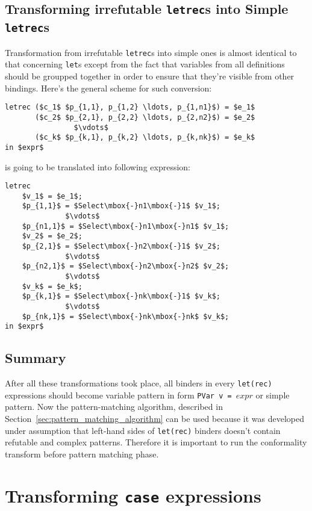\documentclass[a4paper]{report}
\begin{document}
\subsection{Transforming irrefutable \texttt{letrec}s into Simple \texttt{letrec}s}
Transformation from irrefutable \texttt{letrec}s into simple ones is almost
identical to that concerning \texttt{let}s except from the fact that variables
from all definitions should be groupped together in order to ensure that
they're visible from other bindings. Here's the general scheme for such
conversion:
\begin{lstlisting}[mathescape=true]
letrec ($c_1$ $p_{1,1}, p_{1,2} \ldots, p_{1,n1}$) = $e_1$
       ($c_2$ $p_{2,1}, p_{2,2} \ldots, p_{2,n2}$) = $e_2$
                $\vdots$
       ($c_k$ $p_{k,1}, p_{k,2} \ldots, p_{k,nk}$) = $e_k$
in $expr$
\end{lstlisting}
is going to be translated into following expression:
\begin{lstlisting}[mathescape=true]
letrec
    $v_1$ = $e_1$;
    $p_{1,1}$ = $Select\mbox{-}n1\mbox{-}1$ $v_1$;
              $\vdots$
    $p_{n1,1}$ = $Select\mbox{-}n1\mbox{-}n1$ $v_1$;
    $v_2$ = $e_2$;
    $p_{2,1}$ = $Select\mbox{-}n2\mbox{-}1$ $v_2$;
              $\vdots$
    $p_{n2,1}$ = $Select\mbox{-}n2\mbox{-}n2$ $v_2$;
              $\vdots$
    $v_k$ = $e_k$;
    $p_{k,1}$ = $Select\mbox{-}nk\mbox{-}1$ $v_k$;
              $\vdots$
    $p_{nk,1}$ = $Select\mbox{-}nk\mbox{-}nk$ $v_k$;
in $expr$
\end{lstlisting}

\subsection{Summary}
After all these transformations took place, all binders in every
\texttt{let(rec)} expressions should become variable pattern in form
\texttt{PVar v = $expr$} or simple pattern. Now the pattern-matching algorithm,
described in Section~\ref{sec:pattern_matching_algorithm} can be used because
it was developed under assumption that left-hand sides of \texttt{let(rec)}
binders doesn't contain refutable and complex patterns. Therefore it is
important to run the conformality transform before pattern matching phase.

\section{Transforming \texttt{case} expressions}
\end{document}
